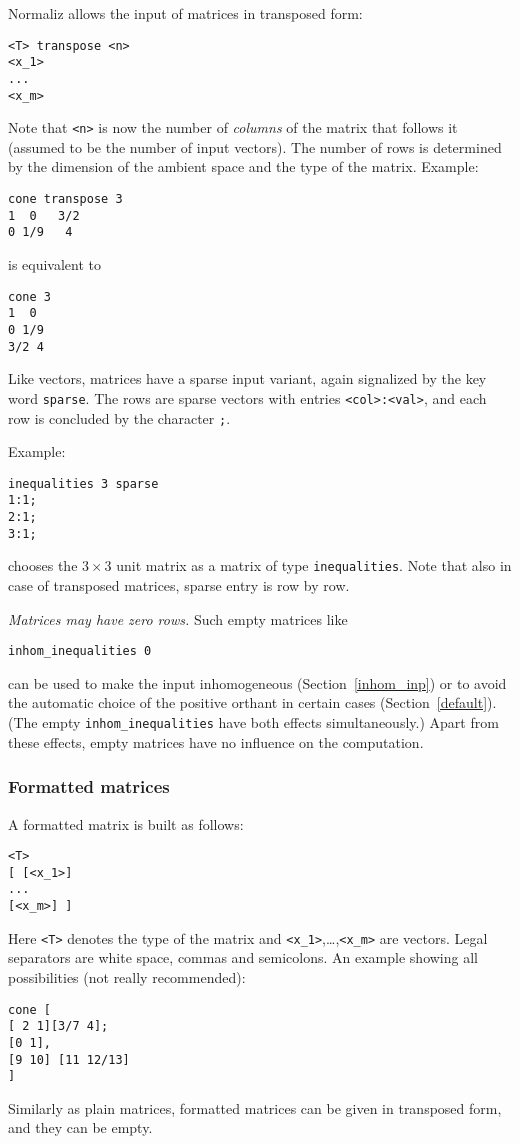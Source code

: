 \documentclass[12pt,a4paper]{scrartcl}
\theoremstyle{definition}
\def\ttt{\texttt}
\begin{document}
Normaliz allows the input of matrices in transposed form:
\begin{Verbatim}
<T> transpose <n>
<x_1>
...
<x_m>
\end{Verbatim}
Note that \verb|<n>| is now the number of \emph{columns} of the matrix that follows it (assumed to be the number of input vectors). The number of rows is determined by the dimension of the ambient space and the type of the matrix. Example:
\begin{Verbatim}
cone transpose 3
1  0   3/2
0 1/9   4
\end{Verbatim}
is equivalent to
\begin{Verbatim}
cone 3
1  0
0 1/9
3/2 4
\end{Verbatim}

Like vectors, matrices have a sparse input variant, again signalized by the key word \verb|sparse|. The rows are sparse vectors with entries \verb|<col>:<val>|, and each row is concluded by the character \verb|;|.

Example:
\begin{Verbatim}
inequalities 3 sparse
1:1;
2:1;
3:1;
\end{Verbatim}
chooses the $3\times 3$ unit matrix as a matrix of type \verb|inequalities|. Note that also in case of transposed matrices, sparse entry is row by row.

\emph{Matrices may have zero rows.} Such empty matrices like
\begin{Verbatim}
inhom_inequalities 0
\end{Verbatim}

can be used to make the input inhomogeneous (Section~\ref{inhom_inp}) or to avoid the automatic choice of the positive orthant in certain cases (Section~\ref{default}). (The empty \verb|inhom_inequalities| have both effects simultaneously.) Apart from these effects, empty matrices have no influence on the computation.

\subsubsection{Formatted matrices}

A formatted matrix is built as follows:
\begin{Verbatim}
<T>
[ [<x_1>]
...
[<x_m>] ]
\end{Verbatim}
Here \ttt{<T>} denotes the type of the matrix and \verb|<x_1>|,\dots,\verb|<x_m>| are vectors. Legal separators are white space, commas and semicolons. An example showing all possibilities (not really recommended):
\begin{Verbatim}
cone [
[ 2 1][3/7 4];
[0 1],
[9 10] [11 12/13]
]
\end{Verbatim}
Similarly as plain matrices, formatted matrices can be given in transposed form, and they can be empty.
\end{document}
